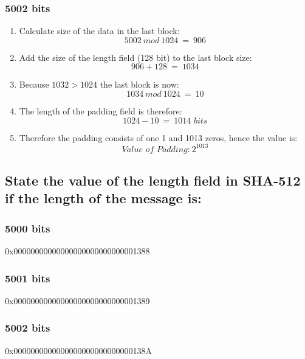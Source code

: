 \documentclass{report}
\begin{document}
			\subsubsection{5002 bits}
			\startsubsection
				\begin{enumerate}
					\item Calculate size of the data in the last block:
					\[
						5002 \ mod \ 1024 \ = \ 906
					\]
					\item Add the size of the length field (128 bit) to the last block size:
					\[
						906 + 128 \ = \ 1034
					\]
					\item Because $1032 > 1024$ the last block is now:
					\[
						1034 \ mod \ 1024 \ = \ 10
					\]
					\item The length of the padding field is therefore:
					\[
						1024 - 10 \ = \ 1014 \textit{ bits}
					\]
					\item Therefore the padding consists of one 1 and 1013 zeros, hence the value is:
					\[
						\textit{Value of Padding:} \ 2^{1013}
					\]
				\end{enumerate}
			\closesection
		\closesection
		\subsection{State the value of the length field in SHA-512 if the length of the message is:}
		\startsubsection
			\subsubsection{5000 bits}
			\startsubsection
				0x00000000000000000000000000001388
			\closesection
			\subsubsection{5001 bits}
			\startsubsection
				0x00000000000000000000000000001389
			\closesection
			\subsubsection{5002 bits}
			\startsubsection
				0x0000000000000000000000000000138A
			\closesection
		\closesection
	\closesection
\end{document}

